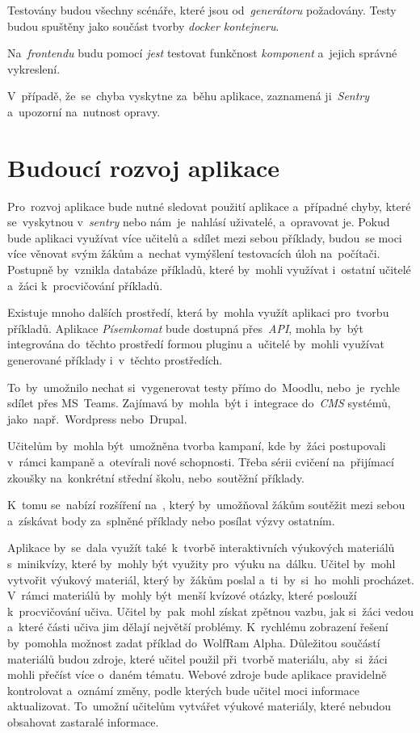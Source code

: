\documentclass[10pt,a4paper]{article}
\begin{document}
            Testovány budou všechny scénáře, které jsou od~\emph{generátoru} požadovány. Testy budou spuštěny jako součást tvorby \emph{docker kontejneru}.

            Na~\emph{frontendu} budu pomocí \emph{jest} testovat funkčnost \emph{komponent} a~jejich správné vykreslení.

            V~případě, že~se~chyba vyskytne za~běhu aplikace, zaznamená ji~\emph{Sentry} a~upozorní na~nutnost opravy.
        
	\section{Budoucí rozvoj aplikace}
        Pro~rozvoj aplikace bude nutné sledovat použití aplikace a~případné chyby, které se~vyskytnou v~\emph{sentry} nebo nám~je~nahlásí uživatelé, a~opravovat je.
        Pokud bude aplikaci využívat více učitelů a~sdílet mezi sebou příklady, budou~se moci více věnovat svým žákům a~nechat vymýšlení testovacích úloh na~počítači. Postupně by~vznikla databáze příkladů, které by~mohli využívat i~ostatní učitelé a~žáci k~procvičování příkladů.
        
        Existuje mnoho dalších prostředí, která by~mohla využít aplikaci pro~tvorbu příkladů. Aplikace \emph{Písemkomat} bude dostupná přes~\emph{API}, mohla by~být integrována do~těchto prostředí formou pluginu a~učitelé by~mohli využívat generované příklady i~v~těchto prostředích.
        
        To~by~umožnilo nechat si~vygenerovat testy přímo do~Moodlu, nebo~je~rychle sdílet přes MS~Teams. Zajímavá by~mohla~být i~integrace do~\emph{CMS} systémů, jako~např.~Wordpress nebo~Drupal.

        Učitelům by~mohla být~umožněna tvorba kampaní, kde by~žáci postupovali v~rámci kampaně a~otevírali nové schopnosti. Třeba sérii cvičení na~přijímací zkoušky na~konkrétní střední školu, nebo~soutěžní příklady.
        
        K~tomu se~nabízí rozšíření na~, který by~umožňoval žákům soutěžit mezi sebou a~získávat body za~splněné příklady nebo posílat výzvy ostatním.

        Aplikace by~se~dala využít také~k~tvorbě interaktivních výukových materiálů s~minikvízy, které by~mohly být využity pro~výuku na~dálku. Učitel by~mohl vytvořit výukový materiál, který by~žákům poslal a~ti~by~si~ho~mohli procházet. V~rámci materiálů by~mohly být~menší kvízové otázky, které poslouží k~procvičování učiva. Učitel by~pak~mohl získat zpětnou vazbu, jak si~žáci vedou a~které části učiva jim dělají největší problémy. K~rychlému zobrazení řešení by~pomohla možnost zadat příklad do~WolfRam Alpha. Důležitou součástí materiálů budou zdroje, které učitel použil při~tvorbě materiálu, aby~si~žáci mohli přečíst více o~daném tématu. Webové zdroje bude aplikace pravidelně kontrolovat a~oznámí změny, podle kterých bude učitel moci informace aktualizovat. To~umožní učitelům vytvářet výukové materiály, které nebudou obsahovat zastaralé informace.
        
\end{document}
